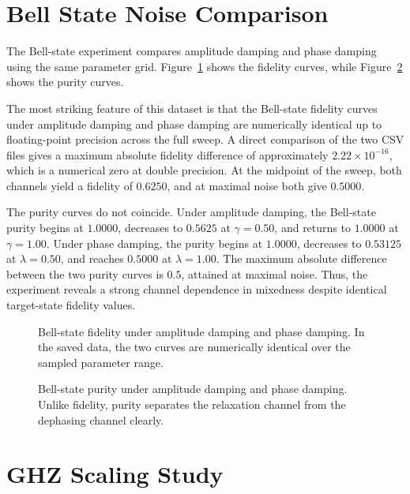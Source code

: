 \section{Bell State Noise Comparison}

The Bell-state experiment compares amplitude damping and phase damping using the same parameter grid. Figure~\ref{fig:bell_fidelity} shows the fidelity curves, while Figure~\ref{fig:bell_purity} shows the purity curves.

The most striking feature of this dataset is that the Bell-state fidelity curves under amplitude damping and phase damping are numerically identical up to floating-point precision across the full sweep. A direct comparison of the two CSV files gives a maximum absolute fidelity difference of approximately $2.22 \times 10^{-16}$, which is a numerical zero at double precision. At the midpoint of the sweep, both channels yield a fidelity of $0.6250$, and at maximal noise both give $0.5000$.

The purity curves do not coincide. Under amplitude damping, the Bell-state purity begins at $1.0000$, decreases to $0.5625$ at $\gamma=0.50$, and returns to $1.0000$ at $\gamma=1.00$. Under phase damping, the purity begins at $1.0000$, decreases to $0.53125$ at $\lambda=0.50$, and reaches $0.5000$ at $\lambda=1.00$. The maximum absolute difference between the two purity curves is $0.5$, attained at maximal noise. Thus, the experiment reveals a strong channel dependence in mixedness despite identical target-state fidelity values.

\begin{figure}[t]
\centering
{}
\caption{Bell-state fidelity under amplitude damping and phase damping. In the saved data, the two curves are numerically identical over the sampled parameter range.}
\label{fig:bell_fidelity}
\end{figure}

\begin{figure}[t]
\centering
{}
\caption{Bell-state purity under amplitude damping and phase damping. Unlike fidelity, purity separates the relaxation channel from the dephasing channel clearly.}
\label{fig:bell_purity}
\end{figure}

\section{GHZ Scaling Study}

